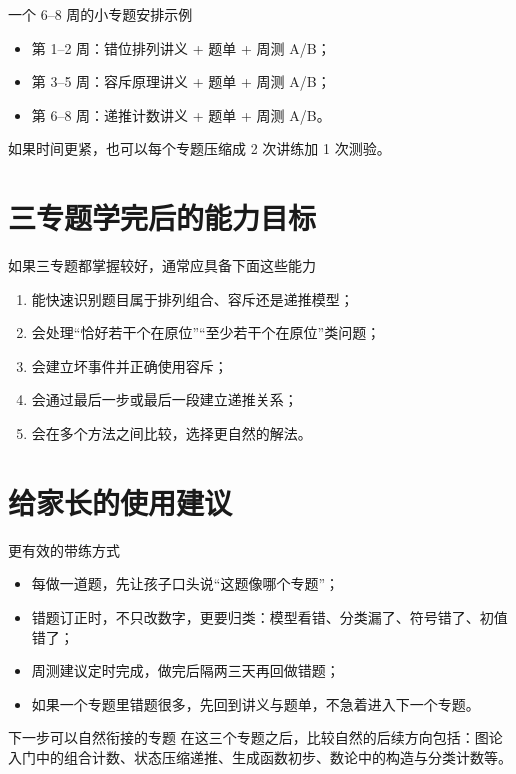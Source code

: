 \documentclass[11pt,a4paper,fontset=fandol]{ctexart}
\begin{document}
\begin{infobox}{一个 6--8 周的小专题安排示例}
\begin{itemize}
  \item 第 1--2 周：错位排列讲义 + 题单 + 周测 A/B；
  \item 第 3--5 周：容斥原理讲义 + 题单 + 周测 A/B；
  \item 第 6--8 周：递推计数讲义 + 题单 + 周测 A/B。
\end{itemize}
如果时间更紧，也可以每个专题压缩成 2 次讲练加 1 次测验。
\end{infobox}

\section{三专题学完后的能力目标}

\begin{goalbox}{如果三专题都掌握较好，通常应具备下面这些能力}
\begin{enumerate}
  \item 能快速识别题目属于排列组合、容斥还是递推模型；
  \item 会处理“恰好若干个在原位”“至少若干个在原位”类问题；
  \item 会建立坏事件并正确使用容斥；
  \item 会通过最后一步或最后一段建立递推关系；
  \item 会在多个方法之间比较，选择更自然的解法。
\end{enumerate}
\end{goalbox}

\section{给家长的使用建议}

\begin{warnbox}{更有效的带练方式}
\begin{itemize}
  \item 每做一道题，先让孩子口头说“这题像哪个专题”；
  \item 错题订正时，不只改数字，更要归类：模型看错、分类漏了、符号错了、初值错了；
  \item 周测建议定时完成，做完后隔两三天再回做错题；
  \item 如果一个专题里错题很多，先回到讲义与题单，不急着进入下一个专题。
\end{itemize}
\end{warnbox}

\begin{infobox}{下一步可以自然衔接的专题}
在这三个专题之后，比较自然的后续方向包括：图论入门中的组合计数、状态压缩递推、生成函数初步、数论中的构造与分类计数等。
\end{infobox}
\end{document}
